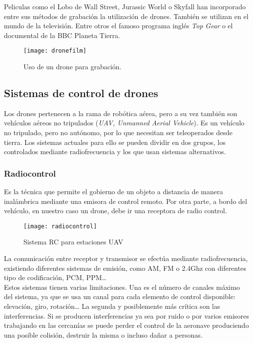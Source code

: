 Peliculas como el Lobo de Wall Street, Jurassic World o Skyfall han incorporado entre sus métodos de grabación la utilización de drones. También se utilizan en el mundo de la televisión. Entre otros el famoso programa inglés \emph{Top Gear} o el documental de la BBC Planeta Tierra.

\begin{figure}[htb]
\centering
\texttt{[image: dronefilm]}
\caption{Uso de un drone para grabación.}
\label{fig:dronefilm}
\end{figure}



\subsection{Sistemas de control de drones}
\label{cap:controldrones}

Los drones pertenecen a la rama de robótica aérea, pero a su vez también son vehículos aéreos no tripulados (\emph{UAV, Unmanned  Aerial Vehicle}). Es un vehículo no tripulado, pero no autónomo, por lo que necesitan ser teleoperados desde tierra. Los sistemas actuales para ello se pueden dividir en dos grupos, los controlados mediante radiofrecuencia y los que usan sistemas alternativos.\\

\subsubsection{Radiocontrol}

Es la técnica que permite el gobierno de un objeto a distancia de manera inalámbrica mediante una emisora de control remoto. Por otra parte, a bordo del vehículo, en nuestro caso un drone, debe ir una receptora de radio control. \\

\begin{figure}[htb]
\centering
\texttt{[image: radiocontrol]}
\caption{Sistema RC para estaciones UAV}
\label{fig:radiocontrol}
\end{figure}


La comunicación entre receptor y transmisor se efectúa mediante radiofrecuencia, existiendo diferentes sistemas de emisión, como AM, FM o 2.4Ghz con diferentes tipo de codificación, PCM, PPM…\\

Estos sistemas tienen varias limitaciones. Una es el número de canales máximo del sistema, ya que se usa un canal para cada elemento de control disponible: elevación, giro, rotación… La segunda y posiblemente más crítica son las interferencias. Si se producen interferencias ya sea por ruido o por varios emisores trabajando en las cercanías se puede perder el control de la aeronave produciendo una posible colisión, destruir la misma o incluso dañar a personas.\\
 
